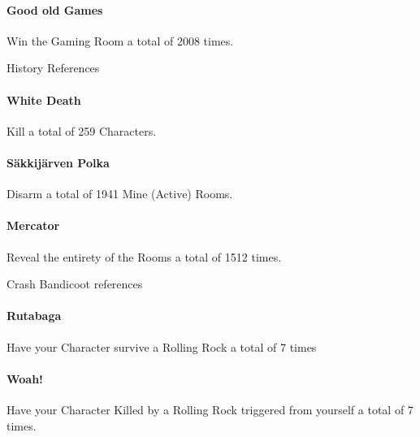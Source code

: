 \paragraph{Good old Games} Win the Gaming Room a total of 2008 times.

History References
\paragraph{White Death} Kill a total of 259 Characters.
\paragraph{Säkkijärven Polka} Disarm a total of 1941 Mine (Active) Rooms.

\paragraph{Mercator} Reveal the entirety of the Rooms a total of 1512 times.

Crash Bandicoot references
\paragraph{Rutabaga} Have your Character survive a Rolling Rock a total of 7 times
\paragraph{Woah!} Have your Character Killed by a Rolling Rock triggered from yourself a total of 7 times.